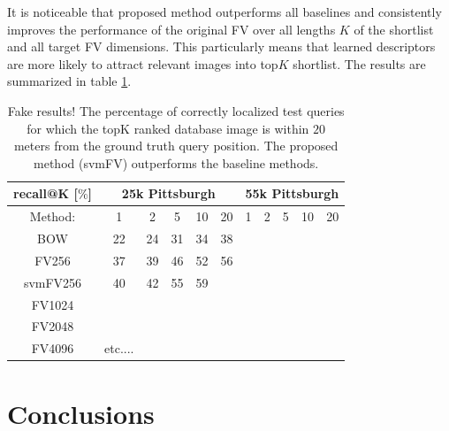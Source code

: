 \documentclass[table]{article} %
\begin{document}
		It is noticeable that proposed method outperforms all baselines and consistently improves the performance of the original FV over all lengths $K$ of the shortlist and all target FV dimensions. This particularly means that learned descriptors are more likely to attract relevant images into top$K$ shortlist. The results are summarized in table \ref{tab:recall}.

\begin{table}
\begin{centering}
	\begin{tabularx}{0.6\linewidth}{c|c c c c c|c c c c c}
		\hline 
		\rowcolor{maroon!50}
		recall@K [$\%$] & \multicolumn{5}{c|}{25k Pittsburgh} & \multicolumn{5}{c|}{55k Pittsburgh} \\
		\hline 
		\hline 
		\rowcolor{maroon!50}
		Method: & 1 & 2 & 5 & 10 & 20 & 1 & 2 & 5 & 10 & 20\\
		\hline
		\rowcolor{maroon!10}
		BOW & 22 & 24 & 31 & 34 & 38 &  &  &  &  & \\
		\rowcolor{maroon!10}
		FV256 & 37 & 39 & 46 & 52 & 56 &  &  &  &  & \\
		\rowcolor{maroon!10}
		svmFV256 & 40  & 42 & 55 & 59 &  &  &  &  &  & \\
		\rowcolor{maroon!10}
		FV1024 &  &  &  &  &  &  &  &  &  &  	\\
		\rowcolor{maroon!10}
		FV2048 &  &  &  &  &  &  &  &  &  & \\
		\rowcolor{maroon!10}
		FV4096 & etc....  &  &  &  &  &  &  &  &  &  \\
		\hline
	\end{tabularx}
	\caption{ \textcolor{myRed}{Fake results!}
		The percentage of correctly localized test queries for which the topK ranked database image is within $20$ meters from the ground truth query position. The proposed method (svmFV) outperforms the baseline methods.
		}
	\label{tab:recall}
\end{centering}
\end{table}


\section{Conclusions}





\small{
	
	
	}
\end{document}

